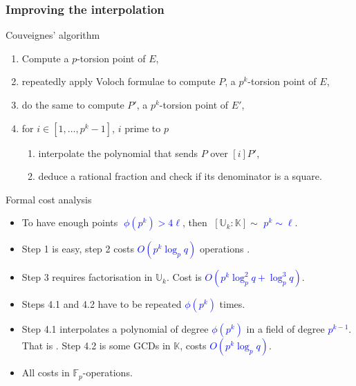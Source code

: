 \documentclass[10pt]{beamer}
\newcommand{\blue}[1]{\textcolor{blue}{#1}}  %
\newcommand{\K}{\mathbb{K}}  %
\newcommand{\U}{\mathbb{U}}  %
\newcommand{\F}{\mathbb{F}}  %
\newcommand{\euler}{\phi}  %
\newcommand{\0}{\mathcal{O}}  %
\begin{document}

\begin{frame}
  \frametitle{Improving the interpolation}

  \vspace{-2mm}

  \begin{block}{Couveignes' algorithm}
    \begin{enumerate}
    \item Compute a $p$-torsion point of $E$,
    \item repeatedly apply Voloch formulae to compute $P$, a $p^k$-torsion
      point of $E$,
    \item do the same to compute $P'$, a $p^k$-torsion point
      of $E'$,
    \item for $i \in [1,\dots,p^k-1]$, $i$ prime to $p$
      \begin{enumerate}
      \item interpolate the polynomial that sends $P$ over $[i]P'$,
      \item deduce a rational fraction and check if its denominator is
        a square.
      \end{enumerate}
    \end{enumerate}
  \end{block}

  \vspace{-2mm}

  \begin{block}{Formal cost analysis}
    \begin{itemize}
    \item To have enough points \blue{$\;\euler(p^k) > 4\ell$}, then
      $\;[\U_k:\K] \sim$ \blue{$p^k \sim \ell$}.
    \item Step 1 is easy, step 2 costs \blue{$O(p^k\log_pq)$}
      operations .
    \item Step 3 requires factorisation in $\U_k$. Cost is
      \blue{$O(p^{k}\log_p^2q + \log_p^3q)$}.
    \item Steps 4.1 and 4.2 have to be repeated
      \blue{$\euler(p^k)$} times.
    \item Step 4.1 interpolates a polynomial of degree
      \blue{$\euler(p^k)$} in a field of degree \blue{$p^{k-1}$}. That
      is
      \alt<2>{\alert{$O(p^{2k}\log_pq)$}}{\blue{$O(p^{2k}\log_pq)$}}. Step
      4.2 is some GCDs in $\K$, costs \blue{$O(p^k\log_pq)$}.
    \item \alert<1>{All costs in $\F_p$-operations.}
    \end{itemize}
  \end{block}
\end{frame}
\end{document}
